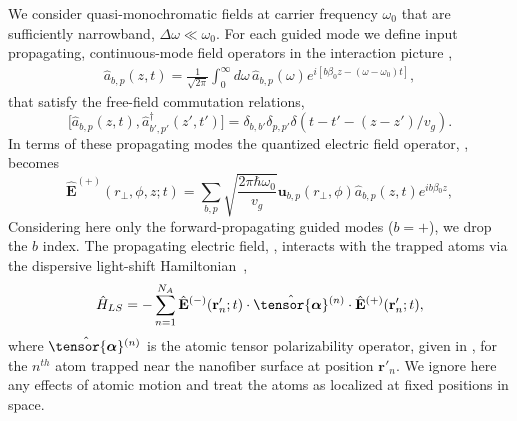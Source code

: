 \documentclass[aps,pra,twocolumn]{revtex4-1} %
\newcommand{\poltens}{\hat{\tensor{\boldsymbol{\alpha}}}}
\begin{document}
We consider quasi-monochromatic fields at carrier frequency $\omega_0$ that are sufficiently narrowband, $\Delta \omega \ll \omega_0$. 
For each guided mode we define input propagating, continuous-mode field operators in the interaction picture \cite{gardiner_input_1985, blow_continuum_1990, le_kien_correlations_2008},
	\begin{align}
		\hat{a}_{b,p}(z,t) =\frac{1}{\sqrt{2 \pi}}  \int_0^{\infty}\!\!\!\!\! d \omega \, \hat{a}_{b,p}(\omega) e^{i[b \beta_0 z- (\omega-\omega_0) t ]}, 
	\end{align}
that satisfy the free-field commutation relations,
	\begin{equation} \label{Eq::InputOutputCommutation}
		\big[\hat{a}_{b,p}(z,t),\hat{a}^\dag_{b'\!,p'}(z'\!,t')\big]=\delta_{b,b'}\delta_{p,p'}  \delta(t\!-\!t'\!\!-\!(\!z\!-\!z')/v_g).
	\end{equation}
In terms of these propagating modes the quantized electric field operator, , becomes
	\begin{equation} \label{Eq::PropagatingElectricField}
		\!\!\!\hat{\mathbf{E}}^{(+)}(\!r\!_\perp\!,\phi,z;t\!) \!=\!\! \sum_{b,p}\!\! \sqrt{ \frac{2 \pi \hbar \omega_0}{ v_g} } \mathbf{u}_{b,p}(r\!_\perp\!,\phi) \hat{a}_{b,p}(\!z\!,t\!)  e^{i b \beta\!_0 z}\!,
	\end{equation}	
Considering here only the forward-propagating guided modes ($b=+$), we drop the $b$ index.  
The propagating electric field, , interacts with the trapped atoms via the dispersive light-shift Hamiltonian~\cite{deutsch_quantum_2010,kien_dynamical_2013,baragiola_open_2014},
	\begin{equation} \label{Eq::LightShiftHam}
		\hat{H}_{LS} = - \sum_{n=1}^{N_A} \hat{\mathbf{E}}^{(-)}(\mathbf{r}'_n ; t ) \cdot \poltens {}^{(n)} \cdot \hat{\mathbf{E}}^{(+)}(\mathbf{r}'_n ;t ),
	\end{equation}
where $\poltens {}^{(n)}$ is the atomic tensor polarizability operator, given in , for the $n^{th}$ atom trapped near the nanofiber surface at position $\mathbf{r}'_n$.  We ignore here any effects of atomic motion and treat the atoms as localized at fixed positions in space.
\end{document}
